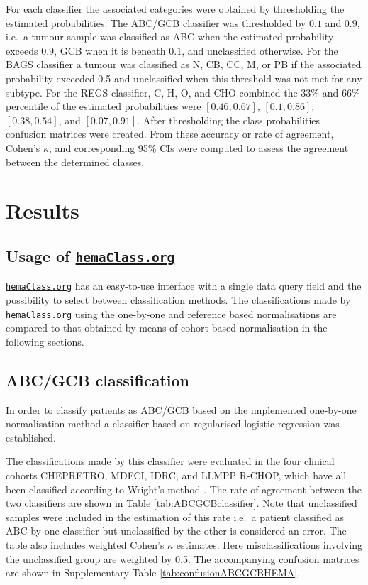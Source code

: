\documentclass{article}
\newcommand{\hemaClass}{\href{http://hemaClass.org}{\texttt{hemaClass.org}}}
\begin{document}
For each classifier the associated categories were obtained by thresholding the estimated probabilities.
The ABC/GCB classifier was thresholded by $0.1$ and $0.9$, i.e.\ a tumour sample was classified as ABC when the estimated probability exceeds $0.9$, GCB when it is beneath 0.1, and unclassified otherwise.
For the BAGS classifier a tumour was classified as N, CB, CC, M, or PB if the associated probability exceeded 0.5 and unclassified when this threshold was not met for any subtype.
For the REGS classifier, C, H, O, and CHO combined the 33\% and 66\% percentile of the estimated probabilities were $[0.46, 0.67]$, $[0.1, 0.86]$, $[0.38, 0.54]$, and $[0.07, 0.91]$.
After thresholding the class probabilities confusion matrices were created.
From these accuracy or rate of agreement, Cohen's $\kappa$, and corresponding 95\% CIs were computed to assess the agreement between the determined classes.


\section{Results}
\subsection{Usage of \hemaClass{}}
\hemaClass{} has an easy-to-use interface with a single data query field and the possibility to select between classification methods.
The classifications made by \hemaClass{} using the one-by-one and reference based normalisations are compared to that obtained by means of cohort based normalisation in the following sections.

\subsection{ABC/GCB classification}
In order to classify patients as ABC/GCB based on the implemented one-by-one normalisation method a classifier based on regularised logistic regression was established.

The classifications made by this classifier were evaluated in the four clinical cohorts CHEPRETRO, MDFCI, IDRC, and LLMPP R-CHOP, which have all been classified according to Wright's method \citep{Wright2003,Lenz2008a}.
The rate of agreement between the two classifiers are shown in Table \ref{tab:ABCGCBclassifier}.
Note that unclassified samples were included in the estimation of this rate i.e.\ a patient classified as ABC by one classifier but unclassified by the other is considered an error.
The table also includes weighted Cohen's $\kappa$ estimates.
Here misclassifications involving the unclassified group are weighted by 0.5.
The accompanying confusion matrices are shown in Supplementary Table \ref{tab:confusionABCGCBHEMA}.
\end{document}

